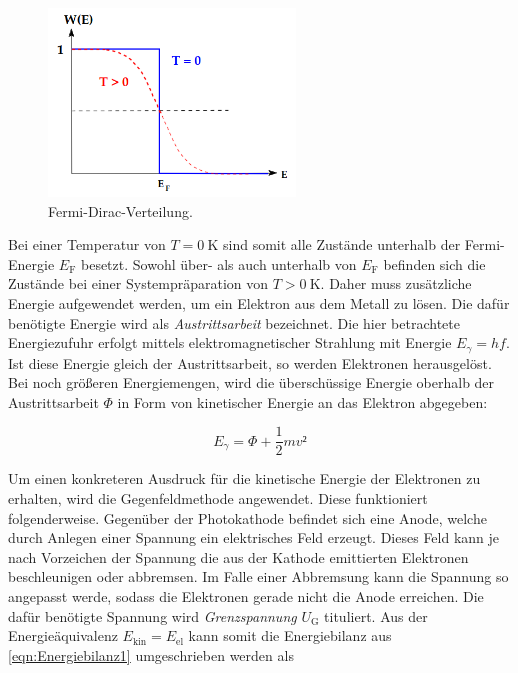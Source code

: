\begin{figure}
    \centering
    \includegraphics[height=5cm]{content/FDV.png}
    \caption{Fermi-Dirac-Verteilung\cite{Versuchsanleitung_v500}.}
    \label{fig:FDV}
\end{figure}

\noindent Bei einer Temperatur von $T = \qty{0}{\kelvin}$ sind somit alle Zustände unterhalb der Fermi-Energie $E_\text{F}$ besetzt. Sowohl über- als auch unterhalb 
von $E_\text{F}$ befinden sich die Zustände bei einer Systempräparation von $T > \qty{0}{\kelvin}$. Daher muss zusätzliche Energie aufgewendet werden, um ein Elektron 
aus dem Metall zu lösen. Die dafür benötigte Energie wird als \emph{Austrittsarbeit} bezeichnet. Die hier betrachtete Energiezufuhr erfolgt mittels elektromagnetischer 
Strahlung mit Energie $E_\gamma = hf$. Ist diese Energie gleich der Austrittsarbeit, so werden Elektronen herausgelöst. Bei noch größeren Energiemengen, wird die
überschüssige Energie oberhalb der Austrittsarbeit $\Phi$ in Form von kinetischer Energie an das Elektron abgegeben:

\begin{equation}
    E_\gamma = \Phi + \frac{1}{2}mv²
\label{eqn:Energiebilanz1}
\end{equation}

\noindent Um einen konkreteren Ausdruck für die kinetische Energie der Elektronen zu erhalten, wird die Gegenfeldmethode angewendet. Diese funktioniert folgenderweise.
Gegenüber der Photokathode befindet sich eine Anode, welche durch Anlegen einer Spannung ein elektrisches Feld erzeugt. Dieses Feld kann je nach Vorzeichen der Spannung 
die aus der Kathode emittierten Elektronen beschleunigen oder abbremsen. Im Falle einer Abbremsung kann die Spannung so angepasst werde, sodass die Elektronen gerade nicht 
die Anode erreichen. Die dafür benötigte Spannung wird \emph{Grenzspannung} $U_\text{G}$ tituliert. Aus der Energieäquivalenz $E_\text{kin} =  E_\text{el}$ kann somit die 
Energiebilanz aus \eqref{eqn:Energiebilanz1} umgeschrieben werden als 

